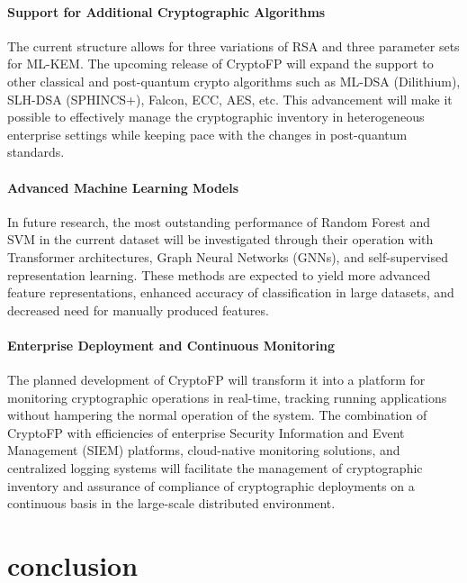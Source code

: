 \documentclass[conference]{IEEEtran}
\begin{document}
\paragraph{Support for Additional Cryptographic Algorithms}
The current structure allows for three variations of RSA and three parameter sets for ML-KEM. The upcoming release of CryptoFP will expand the support to other classical and post-quantum crypto algorithms such as ML-DSA (Dilithium), SLH-DSA (SPHINCS+), Falcon, ECC, AES, etc. This advancement will make it possible to effectively manage the cryptographic inventory in heterogeneous enterprise settings while keeping pace with the changes in post-quantum standards.
\paragraph{Advanced Machine Learning Models}
In future research, the most outstanding performance of Random Forest and SVM in the current dataset will be investigated through their operation with Transformer architectures, Graph Neural Networks (GNNs), and self-supervised representation learning. These methods are expected to yield more advanced feature representations, enhanced accuracy of classification in large datasets, and decreased need for manually produced features.
\paragraph{Enterprise Deployment and Continuous Monitoring}
The planned development of CryptoFP will transform it into a platform for monitoring cryptographic operations in real-time, tracking running applications without hampering the normal operation of the system. The combination of CryptoFP with efficiencies of enterprise Security Information and Event Management (SIEM) platforms, cloud-native monitoring solutions, and centralized logging systems will facilitate the management of cryptographic inventory and assurance of compliance of cryptographic deployments on a continuous basis in the large-scale distributed environment.

\section*{conclusion}
\end{document}
